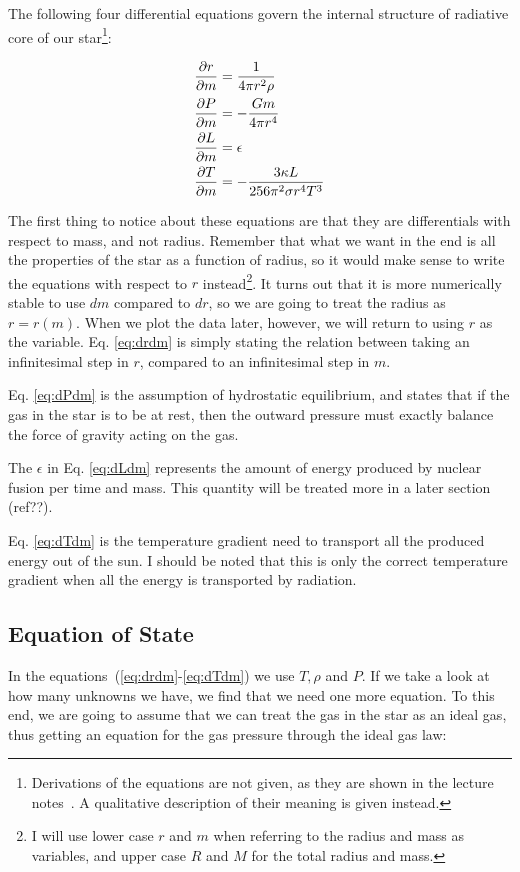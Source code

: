 \documentclass[11pt]{article}
\begin{document}
The following four differential equations govern the internal
structure of radiative core of our star\footnote{Derivations of the
  equations are not given, as they are shown in the lecture
  notes~\cite{lecture-notes}. A qualitative description of their
  meaning is given instead.}:

\begin{align}
  \frac{\partial r}{\partial m} &= \frac{ 1 }{ 4\pi r^2\rho }\label{eq:drdm}\\
  \frac{\partial P}{\partial m} &= - \frac{ Gm }{ 4\pi r^4 }\label{eq:dPdm}\\
  \frac{\partial L}{\partial m} &= \epsilon\label{eq:dLdm}\\
  \frac{\partial T}{\partial m} &= - \frac{ 3\kappa L }{ 256 \pi^2 \sigma r^4T^3 }\label{eq:dTdm}
\end{align}

The first thing to notice about these equations are that they are
differentials with respect to mass, and not radius. Remember that what
we want in the end is all the properties of the star as a function of
radius, so it would make sense to write the equations with respect to
$r$ instead\footnote{I will use lower case $r$ and $m$ when referring
  to the radius and mass as variables, and upper case $R$ and $M$ for
  the total radius and mass.}. It turns out that it is more numerically
stable to use $dm$ compared to $dr$, so we are going to treat the
radius as $r=r(m)$. When we plot the data later, however, we will
return to using $r$ as the variable. Eq. \eqref{eq:drdm} is simply
stating the relation between taking an infinitesimal step in $r$,
compared to an infinitesimal step in $m$. 

Eq. \eqref{eq:dPdm} is the assumption of hydrostatic equilibrium, and
states that if the gas in the star is to be at rest, then the outward
pressure must exactly balance the force of gravity acting on the gas. 

The $\epsilon$ in Eq. \eqref{eq:dLdm} represents the amount of
energy produced by nuclear fusion per time and mass. This quantity
will be treated more in a later section (ref??).

Eq. \eqref{eq:dTdm} is the temperature gradient need to transport all
the produced energy out of the sun. I should be noted that this is
only the correct temperature gradient when all the energy is
transported by radiation. 

\subsection{Equation of State}
In the equations~(\ref{eq:drdm}-\ref{eq:dTdm}) we use $T, \rho$ and
$P$. If we take a look at how many unknowns we have, we find that we
need one more equation. To this end, we are going to assume that we
can treat the gas in the star as an ideal gas, thus getting an
equation for the gas pressure through the ideal gas law:
\end{document}

